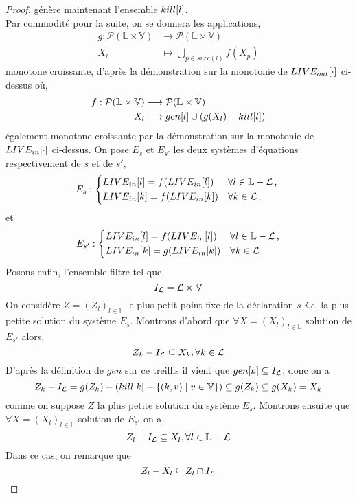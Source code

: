 \documentclass[a4paper, 10pt]{article}
\begin{document}
\begin{proof}
	génère maintenant l'ensemble $kill[l]$.
	\\ 
	Par commodité pour la suite, on se donnera les applications,
	\begin{align*}
		g : \mathcal{P}(\mathbb{L} \times \mathbb{V}) &\longrightarrow \mathcal{P}(\mathbb{L} \times \mathbb{V})\\
		X_l &\longmapsto \bigcup\limits_{p\in succ(l)} f(X_p)
	\end{align*}
	monotone croissante, d'après la démonstration sur la monotonie de $LIVE_{out}[\cdot]$ ci-dessus où,
	\begin{align*}
		f : \mathcal{P}(\mathbb{L} \times \mathbb{V}) &\longrightarrow \mathcal{P}(\mathbb{L} \times \mathbb{V})\\
		X_l &\longmapsto gen[l] \cup (g(X_l) - kill[l])
	\end{align*}
	également monotone croissante par la démonstration sur la monotonie de $LIVE_{in}[\cdot]$ ci-dessus.
	On pose $E_s$ et $E_{s'}$ les deux systèmes d'équations respectivement de $s$ et de $s'$,
	\[
	E_s :
	\begin{dcases*}
		\livein{l} = f(\livein{l}) &$\forall l \in \mathbb{L} - \mathcal{L}$\,, \\
		\livein{k} = f(\livein{k}) &$\forall k \in \mathcal{L}$\,,
	\end{dcases*}
	\]
	et
	\[
	E_{s'} :
	\begin{dcases*}
		\livein{l} = f(\livein{l}) &$\forall l \in \mathbb{L} - \mathcal{L}$\,,\\
		\livein{k} = g(\livein{k}) &$\forall k \in \mathcal{L}$\,.
	\end{dcases*}
	\]
	Posons enfin, l'ensemble filtre tel que,
	\[
		I_{\mathcal{L}} = \mathcal{L} \times \mathbb{V}
	\]
	On considère $Z = (Z_l)_{l\in \mathbb{L}}$ le plus petit point fixe de la déclaration $s$ \textit{i.e.} la plus petite solution du système $E_s$.
	Montrons d'abord que $\forall X = (X_l)_{l\in \mathbb{L}}$ solution de $E_{s'}$ alors,
	\[Z_k - I_{\mathcal{L}} \subseteq X_k, \forall k \in \mathcal{L}\]
	D'après la définition de $gen$ sur ce treillis il vient que $gen[k] \subseteq I_{\mathcal{L}}$, donc on a
	\[Z_k - I_{\mathcal{L}} = g(Z_k) - (kill[k] - \{(k, v) \mid v \in \mathbb{V}\}) \subseteq g(Z_k) \subseteq g(X_k) = X_k\]
	comme on suppose $Z$ la plus petite solution du système $E_s$.
	Montrons ensuite que $\forall X = (X_l)_{l\in \mathbb{L}}$ solution de $E_{s'}$ on a,
	\[
		Z_l - I_{\mathcal{L}} \subseteq X_l, \forall l \in \mathbb{L} - \mathcal{L}
	\]
	Dans ce cas, on remarque que 
	\[Z_l - X_l \subseteq Z_l \cap I_{\mathcal{L}}\] 

\end{proof}
\end{document}
